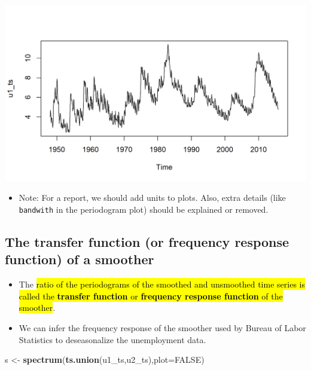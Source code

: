 \documentclass[]{article}
\newenvironment{Shaded}{\begin{snugshade}}{\end{snugshade}}
\newcommand{\KeywordTok}[1]{\textcolor[rgb]{0.13,0.29,0.53}{\textbf{#1}}}
\newcommand{\DataTypeTok}[1]{\textcolor[rgb]{0.13,0.29,0.53}{#1}}
\newcommand{\StringTok}[1]{\textcolor[rgb]{0.31,0.60,0.02}{#1}}
\newcommand{\OtherTok}[1]{\textcolor[rgb]{0.56,0.35,0.01}{#1}}
\newcommand{\NormalTok}[1]{#1}
\providecommand{\tightlist}{%
  \setlength{\itemsep}{0pt}\setlength{\parskip}{0pt}}
\begin{document}
\begin{center}\includegraphics{figure/intro-plot.ts-1} \end{center}

\begin{itemize}
\tightlist
\item
  Note: For a report, we should add units to plots. Also, extra details
  (like \texttt{bandwith} in the periodogram plot) should be explained
  or removed.
\end{itemize}

\subsection{The transfer function (or frequency response function) of a
smoother}\label{the-transfer-function-or-frequency-response-function-of-a-smoother}

\begin{itemize}
\item
  The \hl{ratio of the periodograms of the smoothed and unsmoothed time
  series is called the \textbf{transfer function} or \textbf{frequency
  response function} of the smoother}.
\item
  We can infer the frequency response of the smoother used by Bureau of
  Labor Statistics to deseasonalize the unemployment data.
\end{itemize}

\begin{Shaded}
\begin{Highlighting}[]
\NormalTok{s <-}\StringTok{ }\KeywordTok{spectrum}\NormalTok{(}\KeywordTok{ts.union}\NormalTok{(u1_ts,u2_ts),}\DataTypeTok{plot=}\OtherTok{FALSE}\NormalTok{)}
\end{Highlighting}
\end{Shaded}
\end{document}
